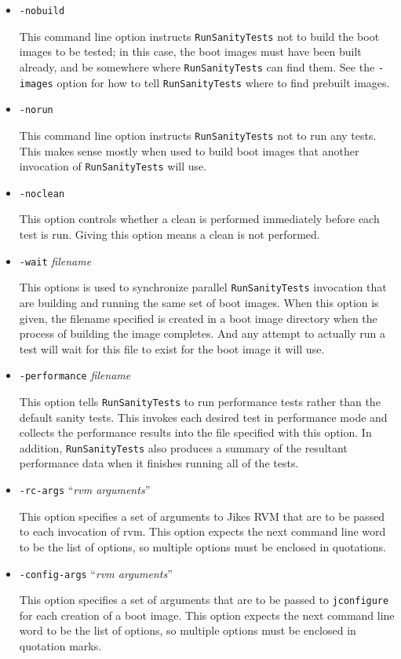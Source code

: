 \begin{itemize}
\item{\tt{-nobuild}}

 This command line option instructs \texttt{RunSanityTests} not to build the
boot images to be tested; in this case, the boot images must have been
built already, and be somewhere where \texttt{RunSanityTests} can find them.
See the {\tt -images} option for how to tell \texttt{RunSanityTests} where to
find prebuilt images.

\item{\tt{-norun}}

 This command line option instructs \texttt{RunSanityTests} not to run
any tests.  This makes sense mostly when used to build boot images
that another invocation of \texttt{RunSanityTests} will use.

\item{\tt{-noclean}}

 This option controls whether a clean is performed immediately before
each test is run.  Giving this option means a clean is not performed.

\item{\tt{-wait}} {\em filename}

 This options is used to synchronize parallel \texttt{RunSanityTests} invocation
that are building and running the same set of boot images.  When this
option is given, the filename specified is created in a boot image
directory when the process of building the image completes.  And any
attempt to actually run a test will wait for this file to exist for
the boot image it will use.

\item{\tt{-performance}} {\em filename}

 This option tells \texttt{RunSanityTests} to run performance tests rather than
the default sanity tests.  This invokes each desired test in
performance mode and collects the performance results into the file
specified with this option.  In addition, {\tt{RunSanityTests}} also
produces a summary of the resultant performance data when it finishes
running all of the tests.

\item{\tt{-rc-args}} ``{\em rvm arguments}''

 This option specifies a set of arguments to Jikes RVM that are to be
passed to each invocation of rvm.  This option expects the next
command line word to be the list of options, so multiple options must
be enclosed in quotations.

\item{\tt{-config-args}} ``{\em rvm arguments}''

 This option specifies a set of arguments that are to be
passed to \texttt{jconfigure} for each creation of a boot image.  This option
expects the next command line word to be the list of options, so
multiple options must be enclosed in quotation marks.

\end{itemize}

